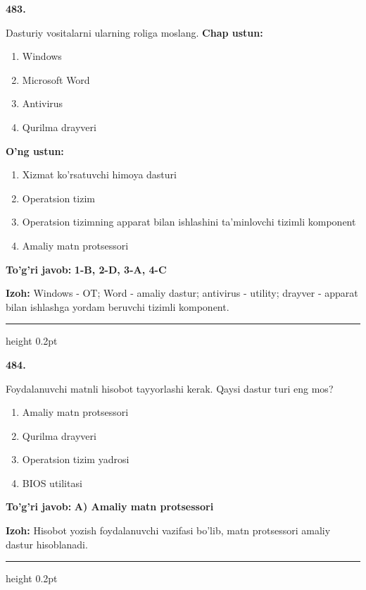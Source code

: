 \documentclass[10pt,a4paper]{article}
\begin{document}
{\bfseries\sffamily\color{ink} 483.}
\par
Dasturiy vositalarni ularning roliga moslang.
\textbf{Chap ustun:}
\begin{enumerate}[label=\arabic*),leftmargin=9mm]
\item Windows
\item Microsoft Word
\item Antivirus
\item Qurilma drayveri
\end{enumerate}
\textbf{O'ng ustun:}
\begin{enumerate}[label=\Alph*),leftmargin=9mm]
\item Xizmat ko'rsatuvchi himoya dasturi
\item Operatsion tizim
\item Operatsion tizimning apparat bilan ishlashini ta'minlovchi tizimli komponent
\item Amaliy matn protsessori
\end{enumerate}
\begin{tcolorbox}[enhanced,breakable,colback=teal!4,colframe=teal!60!black,boxrule=0.45pt,arc=1.2mm,left=2.7mm,right=2.7mm,top=1.8mm,bottom=1.8mm,before skip=2mm,after skip=2mm]
{\bfseries\sffamily\color{teal}To'g'ri javob:} \textbf{1-B, 2-D, 3-A, 4-C}
\par\smallskip
{\bfseries Izoh:} Windows - OT; Word - amaliy dastur; antivirus - utility; drayver - apparat bilan ishlashga yordam beruvchi tizimli komponent.
\end{tcolorbox}
\vspace{2mm}\hrule height 0.2pt\vspace{3mm}

{\bfseries\sffamily\color{ink} 484.}
\par
Foydalanuvchi matnli hisobot tayyorlashi kerak. Qaysi dastur turi eng mos?
\begin{enumerate}[label=\Alph*),leftmargin=9mm]
\item Amaliy matn protsessori
\item Qurilma drayveri
\item Operatsion tizim yadrosi
\item BIOS utilitasi
\end{enumerate}
\begin{tcolorbox}[enhanced,breakable,colback=teal!4,colframe=teal!60!black,boxrule=0.45pt,arc=1.2mm,left=2.7mm,right=2.7mm,top=1.8mm,bottom=1.8mm,before skip=2mm,after skip=2mm]
{\bfseries\sffamily\color{teal}To'g'ri javob:} \textbf{A) Amaliy matn protsessori}
\par\smallskip
{\bfseries Izoh:} Hisobot yozish foydalanuvchi vazifasi bo'lib, matn protsessori amaliy dastur hisoblanadi.
\end{tcolorbox}
\vspace{2mm}\hrule height 0.2pt\vspace{3mm}
\end{document}
